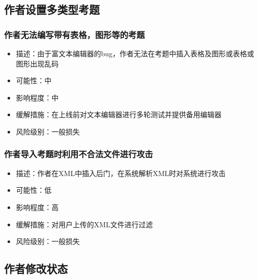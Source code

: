 \documentclass[hyperref, a4paper]{ctexart}
\providecommand{\tightlist}{%
  \setlength{\itemsep}{0pt}\setlength{\parskip}{0pt}}
\begin{document}
\hypertarget{ux4f5cux8005ux8bbeux7f6eux591aux7c7bux578bux8003ux9898-1}{%
\subsection{作者设置多类型考题}\label{ux4f5cux8005ux8bbeux7f6eux591aux7c7bux578bux8003ux9898-1}}

\hypertarget{ux4f5cux8005ux65e0ux6cd5ux7f16ux5199ux5e26ux6709ux8868ux683cux56feux5f62ux7b49ux7684ux8003ux9898}{%
\subsubsection{作者无法编写带有表格，图形等的考题}\label{ux4f5cux8005ux65e0ux6cd5ux7f16ux5199ux5e26ux6709ux8868ux683cux56feux5f62ux7b49ux7684ux8003ux9898}}

\begin{itemize}
\tightlist
\item
  描述：由于富文本编辑器的bug，作者无法在考题中插入表格及图形或表格或图形出现乱码
\item
  可能性：中
\item
  影响程度：中
\item
  缓解措施：在上线前对文本编辑器进行多轮测试并提供备用编辑器
\item
  风险级别：一般损失
\end{itemize}

\hypertarget{ux4f5cux8005ux5bfcux5165ux8003ux9898ux65f6ux5229ux7528ux4e0dux5408ux6cd5ux6587ux4ef6ux8fdbux884cux653bux51fb}{%
\subsubsection{作者导入考题时利用不合法文件进行攻击}\label{ux4f5cux8005ux5bfcux5165ux8003ux9898ux65f6ux5229ux7528ux4e0dux5408ux6cd5ux6587ux4ef6ux8fdbux884cux653bux51fb}}

\begin{itemize}
\tightlist
\item
  描述：作者在XML中插入后门，在系统解析XML时对系统进行攻击
\item
  可能性：低
\item
  影响程度：高
\item
  缓解措施：对用户上传的XML文件进行过滤
\item
  风险级别：一般损失
\end{itemize}

\hypertarget{ux4f5cux8005ux4feeux6539ux72b6ux6001}{%
\subsection{作者修改状态}\label{ux4f5cux8005ux4feeux6539ux72b6ux6001}}
\end{document}
